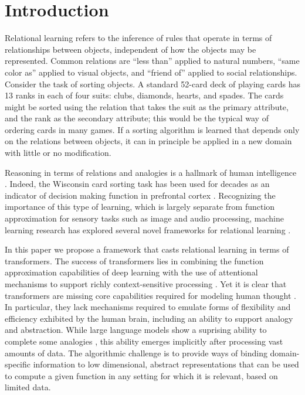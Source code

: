 \section{Introduction}
\label{sec:intro}

Relational learning refers to the inference of rules that operate in terms of
relationships between objects, independent of how the objects may be represented. Common relations are
``less than'' applied to natural numbers, ``same color as'' applied to visual objects, and ``friend of'' applied to
social relationships. Consider the task of sorting objects. A standard 52-card deck of playing cards has 13 ranks in
each of four suits: clubs, diamonds, hearts, and spades. The cards might be sorted using the relation that takes
the suit as the primary attribute, and the rank as the secondary attribute; this would be the typical 
way of ordering cards in many games. If a sorting algorithm is learned that depends 
only on the relations between objects, it can in principle be applied in a new domain with little 
or no modification. 

Reasoning in terms of relations and analogies is a hallmark of human intelligence 
\citep{snow,holyoak}.
Indeed, the Wisconsin card sorting task \citep{berg} has been used for decades as an indicator of decision making
function in prefrontal cortex \citep{monchi}. Recognizing the importance of this type of learning, which is largely
separate from function approximation for sensory tasks such as image and audio processing, machine learning research
has explored several novel frameworks for relational learning \citep{TEM, NTM,episodicControl,esbn,mondal23learned,
battaglia,barrett:2018,santoro1}.

In this paper we propose a framework that casts relational learning in terms of transformers. 
The success of transformers lies in combining the function approximation capabilities of deep learning with the use
of attentional mechanisms to support richly context-sensitive processing \citep{transformers,vaswani2017attention,
    kerg2020untangling}. Yet it is clear that transformers are missing core capabilities required for modeling human
thought \citep{mahowald2023dissociating}.  In particular, they lack mechanisms required to emulate forms of
flexibility and efficiency exhibited by the human brain, including an ability to support analogy and abstraction.
While large language models show a suprising ability to complete some analogies \citep{webb}, this ability 
emerges implicitly after processing vast amounts of data. The algorithmic challenge is to provide ways of binding domain-specific information to low dimensional, abstract representations that can be used to compute a given function in any setting for which it is relevant, based on limited data.

